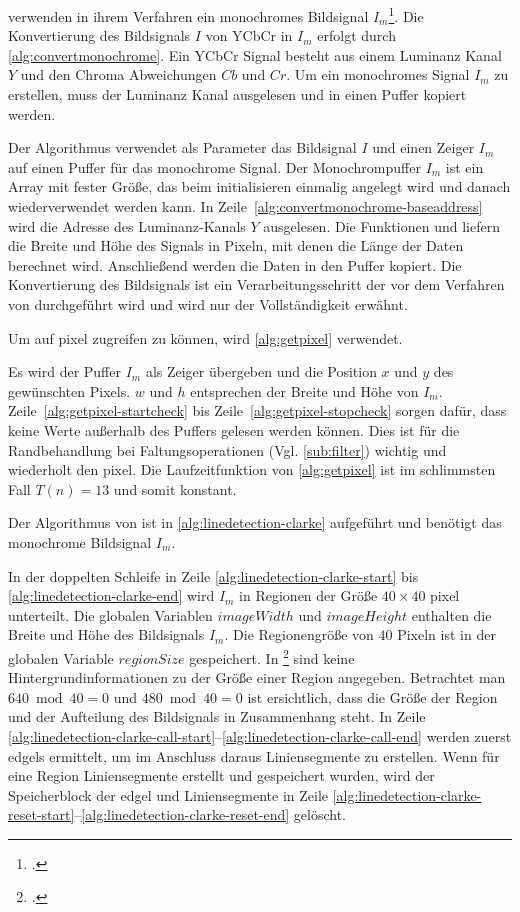 \citeauthor{clarke96} verwenden in ihrem Verfahren ein monochromes Bildsignal $I_m$\footcite[Vgl.][S.~417]{clarke96}.
 Die Konvertierung des Bildsignals $I$ von YCbCr in $I_m$ erfolgt durch \autoref{alg:convertmonochrome}. Ein YCbCr
 Signal besteht aus einem Luminanz Kanal $Y$ und den Chroma Abweichungen $Cb$ und $Cr$. Um ein monochromes Signal $I_m$
 zu erstellen, muss der Luminanz Kanal ausgelesen und in einen Puffer kopiert werden.

Der Algorithmus verwendet als Parameter das Bildsignal $I$ und einen Zeiger $I_m$ auf einen Puffer für das monochrome
 Signal. Der Monochrompuffer $I_m$ ist ein Array mit fester Größe, das beim initialisieren einmalig angelegt wird und
 danach wiederverwendet werden kann. In Zeile~\ref{alg:convertmonochrome-baseaddress} wird die Adresse des
 Luminanz-Kanals $Y$ ausgelesen. Die Funktionen  und  liefern die Breite und Höhe des
 Signals in Pixeln, mit denen die Länge der Daten berechnet wird. Anschließend werden die Daten in den Puffer kopiert.
 Die Konvertierung des Bildsignals ist ein Verarbeitungsschritt der vor dem Verfahren von \citeauthor{clarke96}
 durchgeführt wird und wird nur der Vollständigkeit erwähnt.

Um auf \gls{pixel} zugreifen zu können, wird \autoref{alg:getpixel} verwendet.

Es wird der Puffer $I_m$ als Zeiger übergeben und die Position $x$ und $y$ des gewünschten Pixels. $w$ und $h$
 entsprechen der Breite und Höhe von $I_m$. Zeile~\ref{alg:getpixel-startcheck} bis Zeile~\ref{alg:getpixel-stopcheck}
 sorgen dafür, dass keine Werte außerhalb des Puffers gelesen werden können. Dies ist für die Randbehandlung bei
 Faltungsoperationen (Vgl. \autoref{sub:filter}) wichtig und wiederholt den \gls{pixel}. Die Laufzeitfunktion von
 \autoref{alg:getpixel} ist im schlimmsten Fall $T(n) = 13$ und somit konstant.

Der Algorithmus von \citeauthor{clarke96} ist in \autoref{alg:linedetection-clarke} aufgeführt und benötigt das
 monochrome Bildsignal $I_m$.

In der doppelten Schleife in Zeile \ref{alg:linedetection-clarke-start} bis \ref{alg:linedetection-clarke-end} wird
 $I_m$ in Regionen der Größe $40 \times 40$ \gls{pixel} unterteilt. Die globalen Variablen $\mathit{imageWidth}$ und
 $\mathit{imageHeight}$ enthalten die Breite und Höhe des Bildsignals $I_m$. Die Regionengröße von $40$ Pixeln ist
 in der globalen Variable $\mathit{regionSize}$ gespeichert. In \citeauthor{clarke96}\footcite{clarke96} sind keine
 Hintergrundinformationen zu der Größe einer Region angegeben. Betrachtet man $640 \bmod 40 = 0$ und $480 \bmod 40 = 0$
 ist ersichtlich, dass die Größe der Region und der Aufteilung des Bildsignals in Zusammenhang steht. In Zeile
 \ref{alg:linedetection-clarke-call-start}--\ref{alg:linedetection-clarke-call-end} werden zuerst \glspl{edgel}
 ermittelt, um im Anschluss daraus Liniensegmente zu erstellen. Wenn für eine Region Liniensegmente erstellt und
 gespeichert wurden, wird der Speicherblock der \gls{edgel} und Liniensegmente in Zeile
 \ref{alg:linedetection-clarke-reset-start}--\ref{alg:linedetection-clarke-reset-end} gelöscht.

